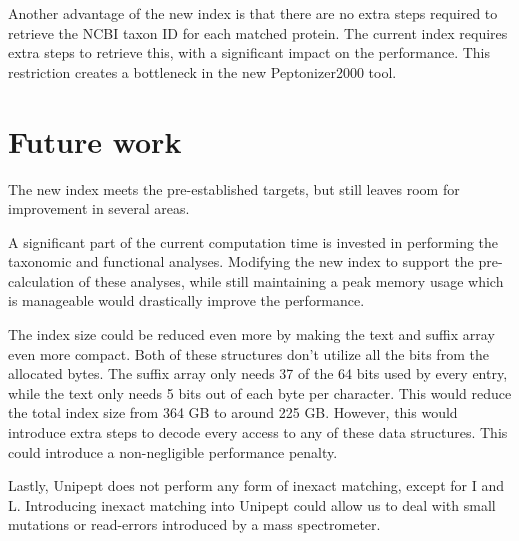 \documentclass[11pt]{article}
\begin{document}
\begin{multicols}{2}
        Another advantage of the new index is that there are no extra steps required to retrieve the NCBI taxon ID for each matched protein.
        The current index requires extra steps to retrieve this, with a significant impact on the performance.
        This restriction creates a bottleneck in the new Peptonizer2000 tool.

        \section{Future work}
        The new index meets the pre-established targets, but still leaves room for improvement in several areas.

        A significant part of the current computation time is invested in performing the taxonomic and functional analyses.
        Modifying the new index to support the pre-calculation of these analyses, while still maintaining a peak memory usage which is manageable would drastically improve the performance.

        The index size could be reduced even more by making the text and suffix array even more compact.
        Both of these structures don't utilize all the bits from the allocated bytes.
        The suffix array only needs 37 of the 64 bits used by every entry, while the text only needs 5 bits out of each byte per character.
        This would reduce the total index size from 364 GB to around 225 GB\@.
        However, this would introduce extra steps to decode every access to any of these data structures.
        This could introduce a non-negligible performance penalty.

        Lastly, Unipept does not perform any form of inexact matching, except for I and L\@.
        Introducing inexact matching into Unipept could allow us to deal with small mutations or read-errors introduced by a mass spectrometer.
        \printbibliography
    \end{multicols}
\end{document}
